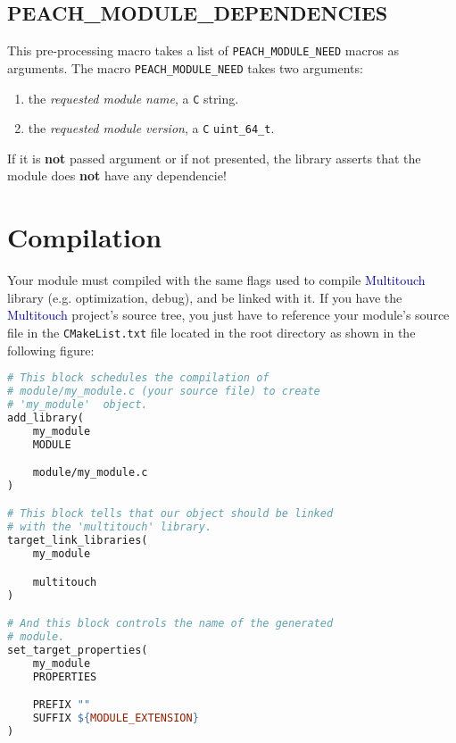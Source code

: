 %
%
\subsection{PEACH\_MODULE\_DEPENDENCIES}
This pre-processing macro takes a list of \texttt{PEACH\_MODULE\_NEED} macros 
as arguments. The macro \texttt{PEACH\_MODULE\_NEED} takes two arguments:
\begin{enumerate}
\item the \textit{requested module name}, a \texttt{C} string.
\item the \textit{requested module version}, a \texttt{C} \texttt{uint\_64\_t}.
\end{enumerate}
If it is \textbf{not} passed argument or if not presented, the library asserts
that the module does \textbf{not} have any dependencie!


%
%
\section{Compilation}
Your module must compiled with the same flags used to compile 
\textcolor{darkblue}{Multitouch} library (e.g. optimization, debug), and be 
linked with it. If you have the \textcolor{darkblue}{Multitouch} project's 
source tree, you just have to reference your module's source file in the 
\texttt{CMakeList.txt} file located in the root directory as shown in the 
following figure:
\begin{lstlisting}[language=make, caption=CMakeList.txt update]
# This block schedules the compilation of 
# module/my_module.c (your source file) to create 
# 'my_module'  object.
add_library(
    my_module
    MODULE

    module/my_module.c
)

# This block tells that our object should be linked 
# with the 'multitouch' library.
target_link_libraries(
    my_module

    multitouch
)

# And this block controls the name of the generated
# module.
set_target_properties(
    my_module
    PROPERTIES

    PREFIX ""
    SUFFIX ${MODULE_EXTENSION}
)
\end{lstlisting}

%
%

